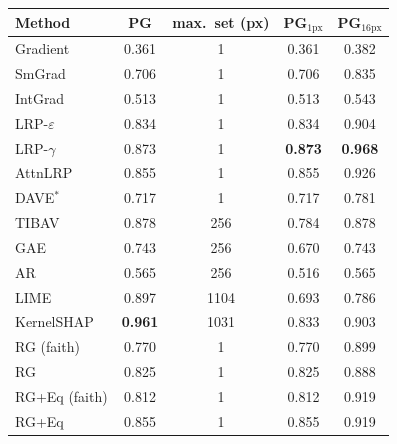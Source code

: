 \begin{tabular}{@{}l c c c c@{}}
\toprule
Method & PG & max.\ set (px) & PG$_{1\mathrm{px}}$ & PG$_{16\mathrm{px}}$ \\
\midrule
Gradient & 0.361 & 1 & 0.361 & 0.382 \\
SmGrad & 0.706 & 1 & 0.706 & 0.835 \\
IntGrad & 0.513 & 1 & 0.513 & 0.543 \\
LRP-$\varepsilon$ & 0.834 & 1 & 0.834 & 0.904 \\
LRP-$\gamma$ & 0.873 & 1 & \textbf{0.873} & \textbf{0.968} \\
AttnLRP & 0.855 & 1 & 0.855 & 0.926 \\
DAVE$^{*}$ & 0.717 & 1 & 0.717 & 0.781 \\
TIBAV & 0.878 & 256 & 0.784 & 0.878 \\
GAE & 0.743 & 256 & 0.670 & 0.743 \\
AR & 0.565 & 256 & 0.516 & 0.565 \\
LIME & 0.897 & 1104 & 0.693 & 0.786 \\
KernelSHAP & \textbf{0.961} & 1031 & 0.833 & 0.903 \\
RG (faith) & 0.770 & 1 & 0.770 & 0.899 \\
RG & 0.825 & 1 & 0.825 & 0.888 \\
RG+Eq (faith) & 0.812 & 1 & 0.812 & 0.919 \\
RG+Eq & 0.855 & 1 & 0.855 & 0.919 \\
\bottomrule
\end{tabular}
